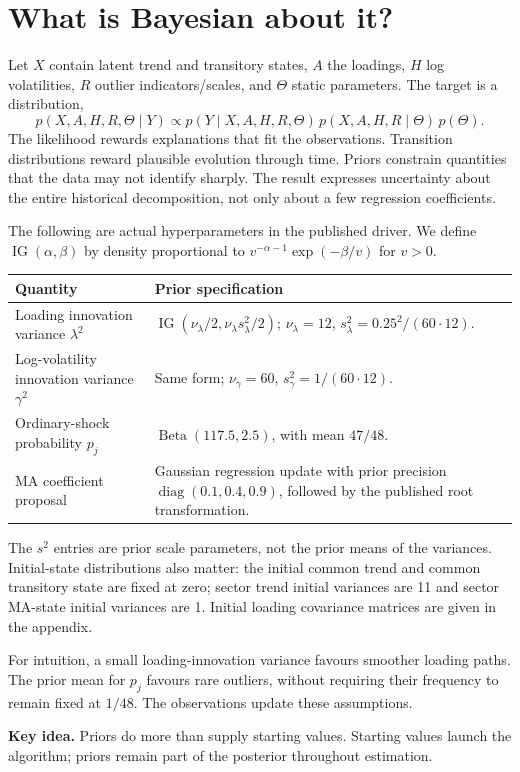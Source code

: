 \documentclass[11pt,a4paper]{article}
\newcommand{\diag}{\operatorname{diag}}
\newcommand{\IG}{\operatorname{IG}}
\newcommand{\takeaway}[1]{\par\medskip\noindent\colorbox{pale}{\parbox{\dimexpr\linewidth-2\fboxsep}{\textbf{Key idea.} #1}}\par\medskip}
\begin{document}
\newpage
\section{What is Bayesian about it?}
Let $X$ contain latent trend and transitory states, $A$ the loadings, $H$ log volatilities, $R$ outlier indicators/scales, and $\Theta$ static parameters. The target is a distribution,
\[
p(X,A,H,R,\Theta\mid Y)
\propto p(Y\mid X,A,H,R,\Theta)\,p(X,A,H,R\mid\Theta)\,p(\Theta).
\]
The likelihood rewards explanations that fit the observations. Transition distributions reward plausible evolution through time. Priors constrain quantities that the data may not identify sharply. The result expresses uncertainty about the entire historical decomposition, not only about a few regression coefficients.

The following are actual hyperparameters in the published driver. We define $\IG(\alpha,\beta)$ by density proportional to $v^{-\alpha-1}\exp(-\beta/v)$ for $v>0$.
\begin{center}
\begin{tabular}{p{.31\linewidth}p{.57\linewidth}}
\toprule
Quantity & Prior specification\\\midrule
Loading innovation variance $\lambda^2$ & $\IG(\nu_\lambda/2,\nu_\lambda s_\lambda^2/2)$; $\nu_\lambda=12$, $s_\lambda^2=0.25^2/(60\cdot12)$.\\[3pt]
Log-volatility innovation variance $\gamma^2$ & Same form; $\nu_\gamma=60$, $s_\gamma^2=1/(60\cdot12)$.\\[3pt]
Ordinary-shock probability $p_j$ & $\operatorname{Beta}(117.5,2.5)$, with mean $47/48$.\\[3pt]
MA coefficient proposal & Gaussian regression update with prior precision $\diag(0.1,0.4,0.9)$, followed by the published root transformation.\\\bottomrule
\end{tabular}
\end{center}
The $s^2$ entries are prior scale parameters, not the prior means of the variances. Initial-state distributions also matter: the initial common trend and common transitory state are fixed at zero; sector trend initial variances are 11 and sector MA-state initial variances are 1. Initial loading covariance matrices are given in the appendix.

For intuition, a small loading-innovation variance favours smoother loading paths. The prior mean for $p_j$ favours rare outliers, without requiring their frequency to remain fixed at $1/48$. The observations update these assumptions.
\takeaway{Priors do more than supply starting values. Starting values launch the algorithm; priors remain part of the posterior throughout estimation.}
\end{document}
